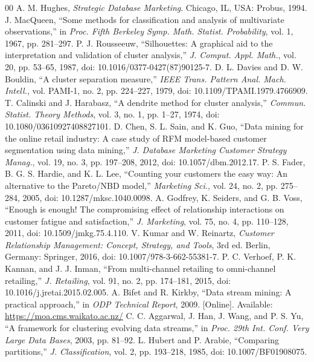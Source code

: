 \documentclass[conference]{IEEEtran}
\begin{document}
\begin{thebibliography}{00}
 A. M. Hughes, \emph{Strategic Database Marketing}. Chicago, IL, USA: Probus, 1994.
 J. MacQueen, ``Some methods for classification and analysis of multivariate observations,'' in \emph{Proc. Fifth Berkeley Symp. Math. Statist. Probability}, vol. 1, 1967, pp. 281--297.
 P. J. Rousseeuw, ``Silhouettes: A graphical aid to the interpretation and validation of cluster analysis,'' \emph{J. Comput. Appl. Math.}, vol. 20, pp. 53--65, 1987, doi: 10.1016/0377-0427(87)90125-7.
 D. L. Davies and D. W. Bouldin, ``A cluster separation measure,'' \emph{IEEE Trans. Pattern Anal. Mach. Intell.}, vol. PAMI-1, no. 2, pp. 224--227, 1979, doi: 10.1109/TPAMI.1979.4766909.
 T. Calinski and J. Harabasz, ``A dendrite method for cluster analysis,'' \emph{Commun. Statist. Theory Methods}, vol. 3, no. 1, pp. 1--27, 1974, doi: 10.1080/03610927408827101.
 D. Chen, S. L. Sain, and K. Guo, ``Data mining for the online retail industry: A case study of RFM model-based customer segmentation using data mining,'' \emph{J. Database Marketing Customer Strategy Manag.}, vol. 19, no. 3, pp. 197--208, 2012, doi: 10.1057/dbm.2012.17.
 P. S. Fader, B. G. S. Hardie, and K. L. Lee, ``Counting your customers the easy way: An alternative to the Pareto/NBD model,'' \emph{Marketing Sci.}, vol. 24, no. 2, pp. 275--284, 2005, doi: 10.1287/mksc.1040.0098.
 A. Godfrey, K. Seiders, and G. B. Voss, ``Enough is enough! The compromising effect of relationship interactions on customer fatigue and satisfaction,'' \emph{J. Marketing}, vol. 75, no. 4, pp. 110--128, 2011, doi: 10.1509/jmkg.75.4.110.
 V. Kumar and W. Reinartz, \emph{Customer Relationship Management: Concept, Strategy, and Tools}, 3rd ed. Berlin, Germany: Springer, 2016, doi: 10.1007/978-3-662-55381-7.
 P. C. Verhoef, P. K. Kannan, and J. J. Inman, ``From multi-channel retailing to omni-channel retailing,'' \emph{J. Retailing}, vol. 91, no. 2, pp. 174--181, 2015, doi: 10.1016/j.jretai.2015.02.005.
 A. Bifet and R. Kirkby, ``Data stream mining: A practical approach,'' in \emph{ODP Technical Report}, 2009. [Online]. Available: \url{https://moa.cms.waikato.ac.nz/}
 C. C. Aggarwal, J. Han, J. Wang, and P. S. Yu, ``A framework for clustering evolving data streams,'' in \emph{Proc. 29th Int. Conf. Very Large Data Bases}, 2003, pp. 81--92.
 L. Hubert and P. Arabie, ``Comparing partitions,'' \emph{J. Classification}, vol. 2, pp. 193--218, 1985, doi: 10.1007/BF01908075.
\end{thebibliography}
\end{document}
